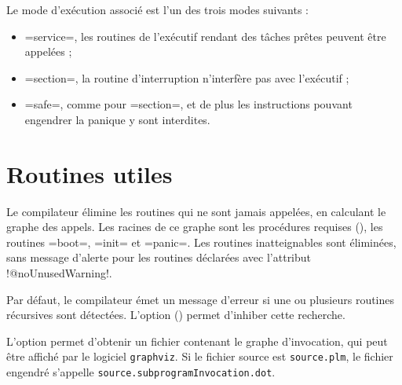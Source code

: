Le mode d'exécution associé est l'un des trois modes suivants :
\begin{itemize}
  \item \plm=service=, les routines de l'exécutif rendant des tâches prêtes peuvent être appelées ;
  \item \plm=section=, la routine d'interruption n'interfère pas avec l'exécutif ;
  \item \plm=safe=, comme pour \plm=section=, et de plus les instructions pouvant engendrer la panique y sont interdites.
\end{itemize}









\section{Routines utiles}

Le compilateur élimine les routines qui ne sont jamais appelées, en calculant le graphe des appels. Les racines de ce graphe sont les procédures requises (), les routines \plm=boot=, \plm=init= et \plm=panic=. Les routines inatteignables sont éliminées, sans message d'alerte pour les routines déclarées avec l'attribut \plm!@noUnusedWarning!.












Par défaut, le compilateur émet un message d'erreur si une ou plusieurs routines récursives sont détectées. L'option  () permet d'inhiber cette recherche.

L'option  permet d'obtenir un fichier contenant le graphe d'invocation, qui peut être affiché par le logiciel \texttt{graphviz}. Si le fichier source est \texttt{source.plm}, le fichier engendré s'appelle \texttt{source.subprogramInvocation.dot}.

